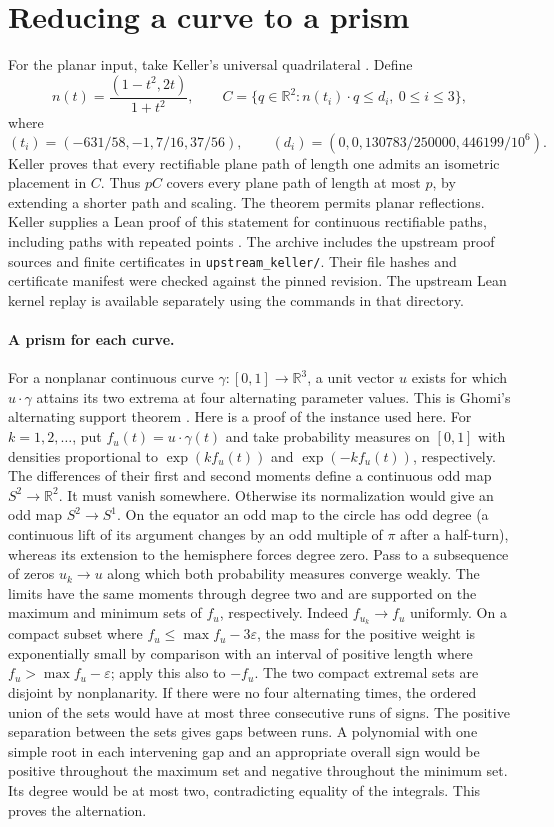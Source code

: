 \section{Reducing a curve to a prism}\label{sec:prism}
For the planar input, take Keller's universal quadrilateral \cite[Thm.~4.1]{keller}. Define
\[
  n(t)=\frac{(1-t^2,2t)}{1+t^2},\qquad
  C=\{q\in\mathbb R^2:n(t_i)\cdot q\le d_i,\ 0\le i\le 3\},
\]
where
\[
 (t_i)=(-631/58,-1,7/16,37/56),\qquad
 (d_i)=(0,0,130783/250000,446199/10^6).
\]
Keller proves that every rectifiable plane path of length one admits an
isometric placement in $C$. Thus $pC$ covers every plane path of length at
most $p$, by extending a shorter path and scaling. The theorem permits planar reflections. Keller supplies a Lean proof of this statement for continuous rectifiable paths, including paths with repeated points \cite{kformal}. The archive includes
the upstream proof sources and finite certificates in \texttt{upstream\_keller/}.
Their file hashes and certificate manifest were checked against the pinned
revision. The upstream Lean kernel replay is available separately using
the commands in that directory.

\paragraph{A prism for each curve.}
For a nonplanar continuous curve $\gamma:[0,1]\to\mathbb R^3$, a unit
vector $u$ exists for which $u\cdot\gamma$ attains its two extrema at
four alternating parameter values. This is Ghomi's alternating support
theorem \cite[Cor.~3.2]{ghomi}. Here is a proof of the instance used here. For $k=1,2,\ldots$,
put $f_u(t)=u\cdot\gamma(t)$ and take probability measures on $[0,1]$
with densities proportional to $\exp(k f_u(t))$ and $\exp(-k f_u(t))$,
respectively. The differences of their first and second moments define
a continuous odd map $S^2\to\mathbb R^2$. It must vanish somewhere. Otherwise its
normalization would give an odd map $S^2\to S^1$. On the equator an odd
map to the circle has odd degree (a continuous lift of its argument changes
by an odd multiple of $\pi$ after a half-turn), whereas its extension to the
hemisphere forces degree zero.
Pass to a subsequence of zeros $u_k\to u$ along which both probability
measures converge weakly. The limits have the same moments through degree
two and are supported on the maximum and minimum sets of $f_u$,
respectively. Indeed $f_{u_k}\to f_u$ uniformly. On a compact subset
where $f_u\le\max f_u-3\varepsilon$, the mass for the positive
weight is exponentially small by comparison with an interval of positive
length where $f_u>\max f_u-\varepsilon$; apply this also to $-f_u$.
The two compact extremal sets are disjoint by nonplanarity.
If there were no four alternating times, the ordered union of the sets
would have at most three consecutive runs of signs. The positive
separation between the sets gives gaps between runs. A polynomial with
one simple root in each intervening gap and an appropriate overall sign
would be positive throughout the maximum set and negative throughout the
minimum set. Its degree would be at most two, contradicting equality of
the integrals. This proves the alternation.

